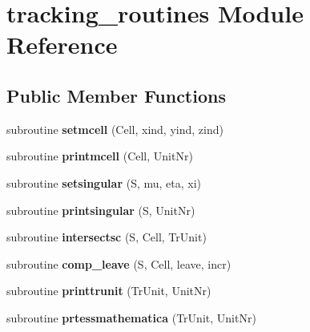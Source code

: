 \hypertarget{classtracking__routines}{\section{tracking\+\_\+routines Module Reference}
\label{classtracking__routines}
}
\subsection*{Public Member Functions}
\begin{DoxyCompactItemize}
\item 
\hypertarget{classtracking__routines_aad92af6cbe8c7f4259002b499bf58bc5}{subroutine {\bfseries setmcell} (Cell, xind, yind, zind)}\label{classtracking__routines_aad92af6cbe8c7f4259002b499bf58bc5}

\item 
\hypertarget{classtracking__routines_a6235e8542f7e718ea025c5203e905a84}{subroutine {\bfseries printmcell} (Cell, Unit\+Nr)}\label{classtracking__routines_a6235e8542f7e718ea025c5203e905a84}

\item 
\hypertarget{classtracking__routines_a502e556352c00b37b2a87bbb0bf5dce9}{subroutine {\bfseries setsingular} (S, mu, eta, xi)}\label{classtracking__routines_a502e556352c00b37b2a87bbb0bf5dce9}

\item 
\hypertarget{classtracking__routines_a1655a5aa67ae5776695d1b328396615c}{subroutine {\bfseries printsingular} (S, Unit\+Nr)}\label{classtracking__routines_a1655a5aa67ae5776695d1b328396615c}

\item 
\hypertarget{classtracking__routines_a1ee5d1f821bf5937b20824e5a5cb2ad8}{subroutine {\bfseries intersectsc} (S, Cell, Tr\+Unit)}\label{classtracking__routines_a1ee5d1f821bf5937b20824e5a5cb2ad8}

\item 
\hypertarget{classtracking__routines_a8bacd5c5f9409cee03ca0a49f6c5370b}{subroutine {\bfseries comp\+\_\+leave} (S, Cell, leave, incr)}\label{classtracking__routines_a8bacd5c5f9409cee03ca0a49f6c5370b}

\item 
\hypertarget{classtracking__routines_acbf11a0ab0b8ccd9d30934b3a3bef605}{subroutine {\bfseries printtrunit} (Tr\+Unit, Unit\+Nr)}\label{classtracking__routines_acbf11a0ab0b8ccd9d30934b3a3bef605}

\item 
\hypertarget{classtracking__routines_a9c2af9144fbcc93ef09b2ffab4492ec8}{subroutine {\bfseries prtessmathematica} (Tr\+Unit, Unit\+Nr)}\label{classtracking__routines_a9c2af9144fbcc93ef09b2ffab4492ec8}


\end{DoxyCompactItemize}
